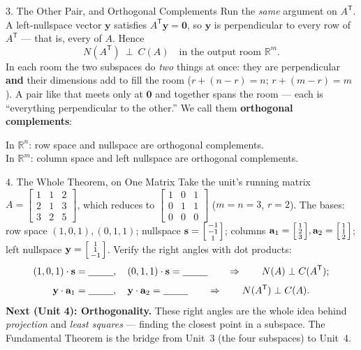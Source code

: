 \documentclass[10pt]{article}
\newcommand{\yy}{\mathbf{y}}
\newcommand{\aaa}{\mathbf{a}}
\newcommand{\svec}{\mathbf{s}}
\newcommand{\zero}{\mathbf{0}}
\newcommand{\T}{\mathsf{T}}
\begin{document}
\begin{notesbox}{3. The Other Pair, and Orthogonal Complements}
Run the \emph{same} argument on $A^{\T}$. A left-nullspace vector $\yy$ satisfies $A^{\T}\yy=\zero$, so $\yy$ is
perpendicular to every row of $A^{\T}$ --- that is, every \blank{1.8cm} of $A$. Hence
\[
  N(A^{\T})\ \perp\ C(A) \quad\text{in the output room }\mathbb{R}^m.
\]
In each room the two subspaces do \emph{two} things at once: they are perpendicular \textbf{and} their
dimensions add to fill the room ($r+(n-r)=n$; $r+(m-r)=m$). A pair like that meets only at $\zero$ and
together spans the room --- each is ``everything perpendicular to the other.'' We call them \textbf{orthogonal
complements}:
\begin{center}\small
In $\mathbb{R}^n$: row space and nullspace are orthogonal complements.\\
In $\mathbb{R}^m$: column space and left nullspace are orthogonal complements.
\end{center}
\end{notesbox}

\begin{notesbox}{4. The Whole Theorem, on One Matrix}
Take the unit's running matrix $A=\begin{bmatrix} 1 & 1 & 2 \\ 2 & 1 & 3 \\ 3 & 2 & 5 \end{bmatrix}$, which
reduces to $\begin{bmatrix} 1 & 0 & 1 \\ 0 & 1 & 1 \\ 0 & 0 & 0 \end{bmatrix}$ ($m=n=3$, $r=2$). The bases:
row space $(1,0,1),(0,1,1)$; nullspace $\svec=\begin{bsmallmatrix} -1\\-1\\1 \end{bsmallmatrix}$; columns
$\aaa_1=\begin{bsmallmatrix} 1\\2\\3 \end{bsmallmatrix},\aaa_2=\begin{bsmallmatrix} 1\\1\\2 \end{bsmallmatrix}$;
left nullspace $\yy=\begin{bsmallmatrix} 1\\1\\-1 \end{bsmallmatrix}$. Verify the right angles with dot products:
\[
  (1,0,1)\cdot\svec=\blank{0.9cm},\quad (0,1,1)\cdot\svec=\blank{0.9cm}
  \qquad\Rightarrow\qquad N(A)\perp C(A^{\T});
\]
\[
  \yy\cdot\aaa_1=\blank{0.9cm},\quad \yy\cdot\aaa_2=\blank{0.9cm}
  \qquad\Rightarrow\qquad N(A^{\T})\perp C(A).
\]
\textbf{Next (Unit 4): Orthogonality.} These right angles are the whole idea behind \emph{projection} and
\emph{least squares} --- finding the closest point in a subspace. The Fundamental Theorem is the bridge from
Unit~3 (the four subspaces) to Unit~4.
\end{notesbox}
\end{document}
